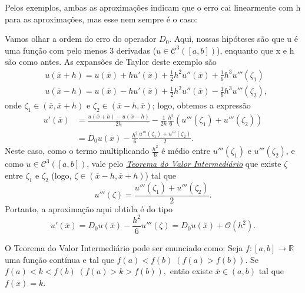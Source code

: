 \documentclass[../differential_methods.tex]{subfiles}
\begin{document}
Pelos exemplos, ambas as aproximações indicam que o erro cai linearmente com h para as aproximações, mas esse nem sempre é o caso:
\begin{example}[Operador \(D_{0}\)]
	Vamos olhar a ordem do erro do operador \(D_{0}\). Aqui, nossas hipóteses são que u é uma função com pelo menos 3 derivadas (\(u\in \mathcal{C}^{3}([a, b])\)), enquanto que x e h são como antes.
	As expansões de Taylor deste exemplo são
	\begin{align*}
		 & u(\overline{x}+h)=u(\overline{x})+hu'(\overline{x})+\frac{1}{2}h^{2}u''(\overline{x})+\frac{1}{6}h^{3}u'''(\zeta_{1})  \\
		 & u(\overline{x}-h)=u(\overline{x})-hu'(\overline{x})+\frac{1}{2}h^{2}u''(\overline{x})-\frac{1}{6}h^{3}u'''(\zeta_{2}),
	\end{align*}
	onde \(\zeta_{1}\in (\overline{x}, \overline{x}+h)\) e \(\zeta_{2}\in (\overline{x}-h, \overline{x})\); logo, obtemos a expressão
	\begin{align*}
		u'(\overline{x}) & = \frac{u(\overline{x}+h)-u(\overline{x}-h)}{2h} - \frac{1}{2h}\frac{h^{3}}{6}(u'''(\zeta_1)+u'''(\zeta_{2})) \\
		                 & =D_{0}u(\overline{x})-\frac{h^{2}}{6}\frac{u'''(\zeta_{1})+u'''(\zeta_{2})}{2}.
	\end{align*}
	Neste caso, como o termo multiplicando \(\frac{h^{2}}{6}\) é médio entre \(u'''(\zeta_{1})\) e \(u'''(\zeta_{2})\), e como \(u\in \mathcal{C}^{3}([a, b])\), vale pelo \hyperlink{intermediate_value}{\textit{Teorema do Valor Intermediário}} que existe \(\zeta \) entre \(\zeta_{1}\) e \(\zeta_{2}\) (logo, \(\zeta \in (\overline{x}-h, \overline{x}+h)\)) tal que
	\[
		u'''(\zeta )=\frac{u'''(\zeta_{1})+u'''(\zeta_{2})}{2}.
	\]
	Portanto, a aproximação aqui obtida é do tipo
	\[
		u'(\overline{x})=D_{0}u(\overline{x})-\frac{h^{2}}{6}u'''(\zeta ) = D_{0}u(\overline{x}) + \mathcal{O}(h^{2}).
	\]
\end{example}

\begin{tcolorbox}[
		skin=enhanced,
		title=Lembrete!,
		after title={\hfill Teorema do Valor Intermediário},
		fonttitle=\bfseries,
		sharp corners=downhill,
		colframe=black,
		colbacktitle=yellow!75!white,
		colback=yellow!30,
		colbacklower=black,
		coltitle=black,
		drop large lifted shadow
	]
	O \hypertarget{intermediate_value}{Teorema do Valor Intermediário} pode ser enunciado como:\linebreak
	Seja \(f:[a, b]\rightarrow \mathbb{R}\) uma função contínua e tal que \(f(a)<f(b)\;(f(a)>f(b))\).\linebreak
	Se \(f(a)<k<f(b)\;(f(a)>k>f(b)),\)	então existe \(\overline{x}\in(a, b)\) tal que \(f(\overline{x})=k.\)
\end{tcolorbox}
\end{document}
